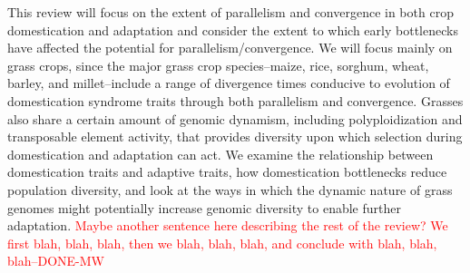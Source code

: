 \documentclass[12pt]{article}
\newcommand{\mbh}[1]{\textcolor{red}{\normalsize  #1}}
\begin{document}
This review will focus on the extent of parallelism and convergence in both crop domestication and adaptation and consider the extent to which early bottlenecks have affected the potential for parallelism/convergence.
We will focus mainly on grass crops, since the major grass crop species--maize, rice, sorghum, wheat, barley, and millet--include a range of divergence times conducive to evolution of domestication syndrome traits through both parallelism and convergence.
Grasses also share a certain amount of genomic dynamism, including polyploidization and transposable element activity, that provides diversity upon which selection during domestication and adaptation can act.
We examine the relationship between domestication traits and adaptive traits, how domestication bottlenecks reduce population diversity, and look at the ways in which the dynamic nature of grass genomes might potentially increase genomic diversity to enable further adaptation.
\mbh{Maybe another sentence here describing the rest of the review?  We first blah, blah, blah, then we blah, blah, blah, and conclude with blah, blah, blah--DONE-MW}
\paragraph{}
\end{document}
